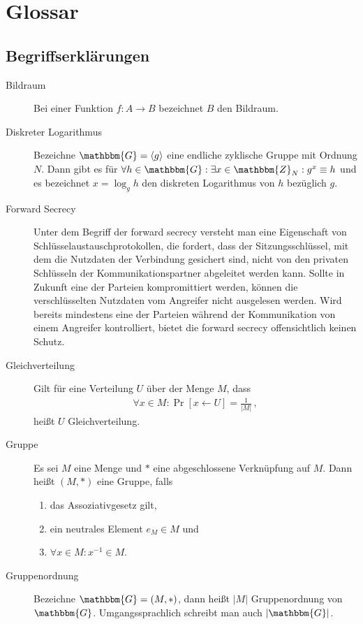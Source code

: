 \chapter{Glossar}
\section{Begriffserklärungen}
\begin{description}
	\item[Bildraum] Bei einer Funktion $f\colon A \rightarrow B$ bezeichnet $B$ den Bildraum.
	\item[Diskreter Logarithmus] Bezeichne $\mathbbm{G} = \langle g \rangle$ eine endliche zyklische Gruppe mit Ordnung $N$. Dann gibt es für
	$\forall h \in \mathbbm{G} : \exists x \in \mathbbm{Z}_N :  g^x \equiv h$ und es bezeichnet $x = \log_g h$ den diskreten Logarithmus von $h$
	bezüglich $g$.
	\item[Forward Secrecy] Unter dem Begriff der forward secrecy versteht man eine Eigenschaft von Schlüsselaustauschprotokollen, die fordert,
	dass der Sitzungsschlüssel, mit dem die Nutzdaten der Verbindung gesichert sind, nicht von den privaten Schlüsseln der Kommunikationspartner
	abgeleitet werden kann. Sollte in Zukunft eine der Parteien kompromittiert werden, können die verschlüsselten Nutzdaten vom Angreifer nicht
	ausgelesen werden. Wird bereits mindestens eine der Parteien während der Kommunikation von einem Angreifer kontrolliert, bietet die forward
	secrecy offensichtlich keinen Schutz.
	\item[Gleichverteilung] Gilt für eine Verteilung $U$ über der Menge $M$, dass
	\begin{align*}
		\forall x \in M : \Pr [x \leftarrow U] = \frac{1}{\vert M \vert}\, ,
	\end{align*}
	heißt $U$ Gleichverteilung.
	\item[Gruppe] Es sei $M$ eine Menge und $\ast$ eine abgeschlossene Verknüpfung auf $M$. Dann heißt $(M, \ast)$ eine Gruppe, falls
	\begin{enumerate}
		\item das Assoziativgesetz gilt,
		\item ein neutrales Element $e_M \in M$ und
		\item $\forall x \in M : x^{-1} \in M$.
	\end{enumerate}
	\item[Gruppenordnung] Bezeichne $\mathbbm{G} = (M, \ast)$, dann heißt $\vert M \vert$ Gruppenordnung von $\mathbbm{G}$. Umgangssprachlich
	schreibt man auch $\vert \mathbbm{G} \vert$.

\end{description}
